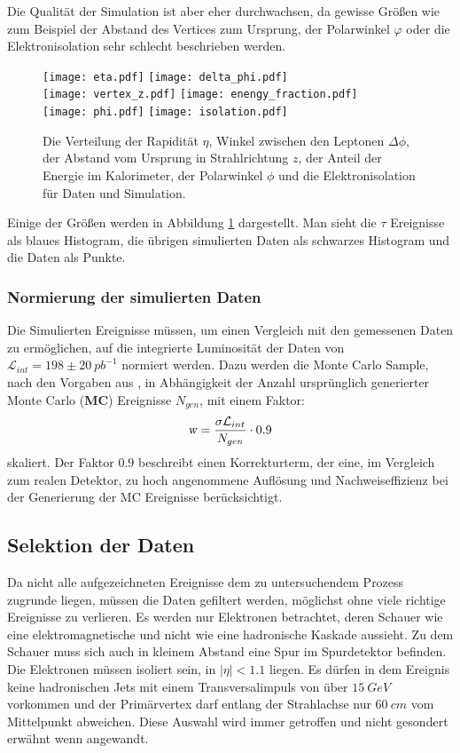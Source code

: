 \documentclass[a4paper,12pt]{article}
\begin{document}
Die Qualität der Simulation ist aber eher durchwachsen, da gewisse Größen wie zum Beispiel der
Abstand des Vertices zum Ursprung, der Polarwinkel $φ$ oder die Elektronisolation sehr schlecht
beschrieben werden.

\begin{figure}[h]
	\centering
	\newcommand{\halftext}{0.49\textwidth}
	\texttt{[image: eta.pdf]}
	\texttt{[image: delta\_phi.pdf]}\\
	\texttt{[image: vertex\_z.pdf]}
	\texttt{[image: enengy\_fraction.pdf]}\\
	\texttt{[image: phi.pdf]}
	\texttt{[image: isolation.pdf]}\\
	\caption{Die Verteilung der Rapidität $η$, Winkel zwischen den Leptonen $Δ\phi$, der Abstand vom Ursprung in
	Strahlrichtung $z$, der Anteil der Energie im Kalorimeter, der Polarwinkel $\phi$ und die
	Elektronisolation für Daten und Simulation. }
	\label{fig:variables}
\end{figure}

Einige der Größen werden in Abbildung \ref{fig:variables} dargestellt. Man sieht die $τ$ Ereignisse
als blaues Histogram, die übrigen simulierten Daten als schwarzes Histogram und die Daten als
Punkte. 
\subsubsection*{Normierung der simulierten Daten}
Die Simulierten Ereignisse müssen, um einen Vergleich mit den gemessenen Daten zu ermöglichen, auf die
integrierte Luminosität der Daten von $\mathcal{L}_{int}=198 \pm \SI{20}{pb^{-1}}$ normiert werden.
Dazu werden die Monte Carlo Sample, nach den Vorgaben aus \cite{versuchsanleitung},
in Abhängigkeit der Anzahl ursprünglich generierter Monte Carlo (\textbf{MC}) Ereignisse $N_{gen}$, mit einem Faktor:
\begin{align*}
	\textsl{w}= \frac{\sigma \mathcal{L}_{int}}{N_{gen}} \cdot 0.9
\end{align*}
skaliert. Der Faktor $0.9$ beschreibt einen Korrekturterm, der eine, im Vergleich zum realen Detektor,
zu hoch angenommene Auflösung und Nachweiseffizienz bei der Generierung der MC Ereignisse berücksichtigt.


\subsection{Selektion der Daten}
Da nicht alle aufgezeichneten Ereignisse dem zu untersuchendem Prozess zugrunde liegen, müssen die
Daten gefiltert werden, möglichst ohne viele richtige Ereignisse zu verlieren. Es werden nur
Elektronen betrachtet, deren Schauer wie eine elektromagnetische und nicht wie eine hadronische
Kaskade aussieht. Zu dem Schauer muss sich auch in kleinem Abstand eine Spur im Spurdetektor befinden.
Die Elektronen müssen isoliert sein, in $|\eta| < 1.1$ liegen. Es dürfen in dem Ereignis keine
hadronischen Jets mit einem Transversalimpuls von über $\SI{15}{GeV}$ vorkommen und der Primärvertex
darf entlang der Strahlachse nur $\SI{60}{cm}$ vom Mittelpunkt abweichen. Diese Auswahl wird immer
getroffen und nicht gesondert erwähnt wenn angewandt.
\end{document}
